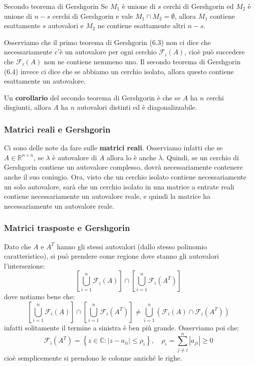 \documentclass[a4paper,11pt]{article}
\begin{document}
\begin{theorem}{Secondo teorema di Gershgorin}
	Se $M_1$ è unione di $s$ cerchi di Gershgorin ed $M_2$ è unione di $n - s$ cerchi di Gershgorin e vale $M_1 \cap M_2 = \emptyset$, allora $M_1$ contiene esattamente $s$ autovalori e $M_2$ ne contiene esattamente altri $n - s$. 
\end{theorem}

Osserviamo che il primo teorema di Gershgorin (6.3) non ci dice che necessariamente c'è un autovalore per ogni cerchio $\mathcal{F}_i(A)$, cioè può succedere che $\mathcal{F}_i(A)$ non ne contiene nemmeno uno.
Il secondo teorema di Gershgorin (6.4) invece ci dice che se abbiamo un cerchio isolato, allora questo contiene esattamente un autovalore.

Un \textbf{corollario} del secondo teorema di Gershgorin è che se $A$ ha $n$ cerchi disgiunti, allora $A$ ha $n$ autovalori distinti ed è diagonalizzabile. 

\subsubsection{Matrici reali e Gershgorin}
Ci sono delle note da fare sulle \textbf{matrici reali}.
Osserviamo infatti che se $A \in \mathbb{R}^{n \times n}$, se $\lambda$ è autovalore di $A$ allora lo è anche $\overline{\lambda}$.
Quindi, se un cerchio di Gershgorin contiene un autovalore complesso, dovrà necessariamente contenere anche il suo coniugio.
Ora, visto che un cerchio isolato contiene necessariamente un solo autovalore, sarà che un cerchio isolato in una matrice a entrate reali contiene necessariamente un autovalore reale, e quindi la matrice ha necessariamente un autovalore reale.

\subsubsection{Matrici trasposte e Gershgorin}
Dato che $A$ e $A^T$ hanno gli stessi autovalori (dallo stesso polinomio caratteristico), si può prendere come regione dove stanno gli autovalori l'intersezione:
$$
\left[ \bigcup_{i = 1}^n \mathcal{F}_i(A) \right] \cap \left[ \bigcup_{i = 1}^n \mathcal{F}_i(A^T) \right]
$$
dove notiamo bene che:
$$
\left[ \bigcup_{i = 1}^n \mathcal{F}_i(A) \right] \cap \left[ \bigcup_{i = 1}^n \mathcal{F}_i(A^T) \right] \neq 
\bigcup_{i = 1}^n \left( \mathcal{F}_i(A) \cap \mathcal{F}_i(A^T) \right)
$$
infatti solitamente il termine a sinistra è ben più grande.
Osserviamo poi che:
$$
\mathcal{F}_i(A^T) = \left\{ z \in \mathbb{C} : |z - a_{ii}| \leq \rho_i \right\}, \quad \rho_i = \sum_{j \neq i}^n |a_{ji}| \geq 0
$$
cioè semplicemente si prendono le colonne anziché le righe. 
\end{document}

